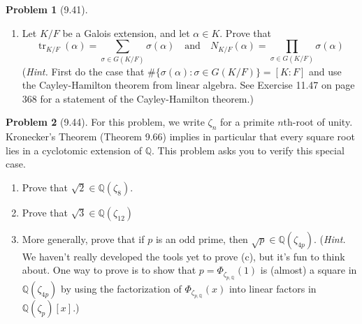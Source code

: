 \documentclass[12pt]{article}
\theoremstyle{definition}
\newtheorem{problem}{Problem}
\DeclareMathOperator{\tr}{tr}
\begin{document}
\begin{problem}[9.41]
\begin{enumerate}[label=(\alph*)]
\begin{solution}
        \end{solution}
        
        \item Let $K/F$ be a Galois extension, and let $\alpha \in K$. Prove that
        \[
            \tr_{K/F}(\alpha) = \sum_{\sigma \in G(K/F)} \sigma(\alpha) \quad \text{and} \quad N_{K/F}(\alpha) = \prod_{\sigma \in G(K/F)} \sigma(\alpha)
        \]
        (\textit{Hint.} First do the case that $\#\{ \sigma(\alpha) : \sigma \in G(K/F) \} = [K : F]$ and use the Cayley-Hamilton
        theorem from linear algebra. See Exercise 11.47 on page 368 for a statement of the Cayley-Hamilton theorem.)
        \begin{solution}
            
        \end{solution}
    \end{enumerate}
\end{problem}

\begin{problem}[9.44]
    For this problem, we write $\zeta_n$ for a primite $n$th-root of unity. Kronecker's Theorem (Theorem 9.66) implies in particular
    that every square root lies in a cyclotomic extension of $\mathbb{Q}$. This problem asks you to verify this special case.
    \begin{enumerate}[label=(\alph*)]
        \item Prove that $\sqrt{2} \in \mathbb{Q}(\zeta_8)$. 
        \begin{solution}

        \end{solution}

        \item Prove that $\sqrt{3} \in \mathbb{Q}(\zeta_12)$
        \begin{solution}

        \end{solution}

        \item More generally, prove that if $p$ is an odd prime, then $\sqrt{p} \in \mathbb{Q}(\zeta_{4p})$.
        (\textit{Hint.} We haven't really developed the tools yet to prove (c), but it's fun to think about.
        One way to prove is to show that $p = \Phi_{\zeta_{p, \mathbb{Q}}}(1)$ is (almost) a square in $\mathbb{Q}(\zeta_{4p})$
        by using the factorization of $\Phi_{\zeta_{p, \mathbb{Q}}}(x)$ into linear factors in $\mathbb{Q}(\zeta_p)[x]$.)
        \begin{solution}

        \end{solution}
    \end{enumerate}
\end{problem}
\end{document}
